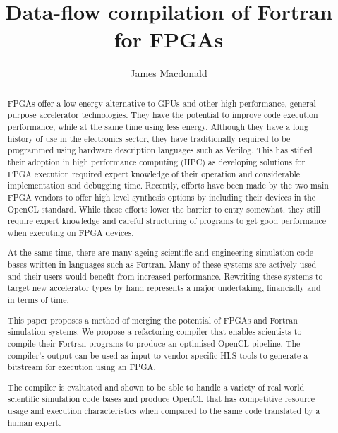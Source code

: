 \documentclass{mpaper}
\begin{document}
\title{Data-flow compilation of Fortran for FPGAs}
\author{James Macdonald}

\maketitle

\begin{abstract}

FPGAs offer a low-energy alternative to GPUs and other high-performance, general purpose accelerator technologies.
They have the potential to improve code execution performance, while at the same time using less energy.
Although they have a long history of use in the electronics sector, they have traditionally required to be programmed using hardware description languages such as Verilog.  
This has stifled their adoption in high performance computing (HPC) as developing solutions for FPGA execution required expert knowledge of their operation and considerable implementation and debugging time.  
Recently, efforts have been made by the two main FPGA vendors to offer high level synthesis options by including their devices in the OpenCL standard.
While these efforts lower the barrier to entry somewhat, they still require expert knowledge and careful structuring of programs to get good performance when executing on FPGA devices. 

At the same time, there are many ageing scientific and engineering simulation code bases written in languages such as Fortran.
Many of these systems are actively used and their users would benefit from increased performance.
Rewriting these systems to target new accelerator types by hand represents a major undertaking, financially and in terms of time.

This paper proposes a method of merging the potential of FPGAs and Fortran simulation systems.
We propose a refactoring compiler that enables scientists to compile their Fortran programs to produce an optimised OpenCL pipeline.
The compiler's output can be used as input to vendor specific HLS tools to generate a bitstream for execution using an FPGA.

The compiler is evaluated and shown to be able to handle a variety of real world scientific simulation code bases and produce OpenCL that has competitive resource usage and execution characteristics when compared to the same code translated by a human expert.

\end{abstract}
\end{document}
